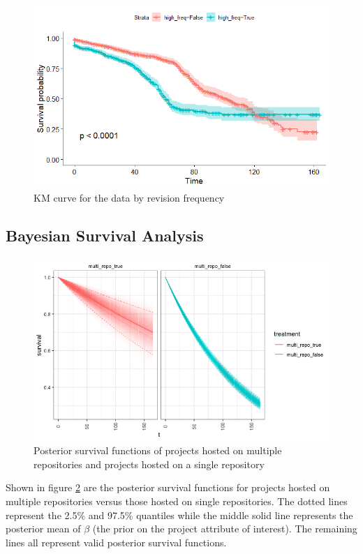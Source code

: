 \documentclass[acmconf]{acmart}
\begin{document}
\begin{figure}[H]
    \centering
    \includegraphics[scale=0.75]{commit_freq.png}
    \caption{KM curve for the data by revision frequency }
    \label{fig:freq}
\end{figure}

\subsection{Bayesian Survival Analysis}

\begin{figure}[H]
    \centering
    \includegraphics[scale=0.4]{multi_repo_bayes.png}
    \caption{Posterior survival functions of projects hosted on multiple repositories and projects hosted on a single repository}
    \label{fig:multi_repo_bayes}
\end{figure}

Shown in figure \ref{fig:multi_repo_bayes} are the posterior survival functions for projects hosted on multiple repositories versus those hosted on single repositories.
The dotted lines represent the  2.5\% and 97.5\% quantiles while the middle solid line represents the posterior mean of $\beta$ (the prior on the project attribute of interest). The remaining lines all represent valid posterior survival functions.
\end{document}

